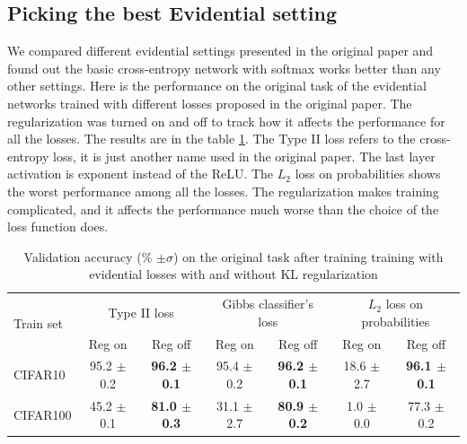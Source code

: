 \documentclass{article}
\begin{document}
\subsection{Picking the best Evidential setting}
We compared different evidential settings presented in the original paper \cite{evidential_classification} and found out the basic cross-entropy network with softmax works better than any other settings.
Here is the performance on the original task of the evidential networks trained with different losses proposed in the original paper.
The regularization was turned on and off to track how it affects the performance for all the losses.
The results are in the table \ref{table:accuracy_evidential}.
The Type II loss refers to the cross-entropy loss, it is just another name used in the original paper.
The last layer activation is exponent instead of the ReLU.
The $L_2$ loss on probabilities shows the worst performance among all the losses.
The regularization makes training complicated, and it affects the performance much worse than the choice of the loss function does.

\begin{table}[H]
  \caption{Validation accuracy (\% $\pm \sigma$) on the original task after training training with evidential losses with and without KL regularization}
  \label{table:accuracy_evidential}
  \vskip 0.15in
  \begin{center}
  \begin{small}
    \begin{tabular}{ l | c c | c c | c c }
      \toprule
      \multirow{2}{*}{Train set} & \multicolumn{2}{c|}{Type II loss} & \multicolumn{2}{c|}{Gibbs classifier's loss} & \multicolumn{2}{c}{$L_2$ loss on probabilities} \\
      & Reg on & Reg off & Reg on & Reg off & Reg on & Reg off \\ \midrule
      CIFAR10
      & 95.2 {\tiny $\pm$ 0.2} & \bf{96.2} {\tiny $\pm$ 0.1}
      & 95.4 {\tiny $\pm$ 0.2} & \bf{96.2} {\tiny $\pm$ 0.1}
      & 18.6 {\tiny $\pm$ 2.7} & \bf{96.1} {\tiny $\pm$ 0.1} \\
      CIFAR100
      & 45.2 {\tiny $\pm$ 0.1} & \bf{81.0} {\tiny $\pm$ 0.3}
      & 31.1 {\tiny $\pm$ 2.7} & \bf{80.9} {\tiny $\pm$ 0.2}
      & 1.0 {\tiny $\pm$ 0.0} & 77.3 {\tiny $\pm$ 0.2} \\
      \bottomrule
    \end{tabular}
  \end{small}
  \end{center}
\end{table}
\end{document}
